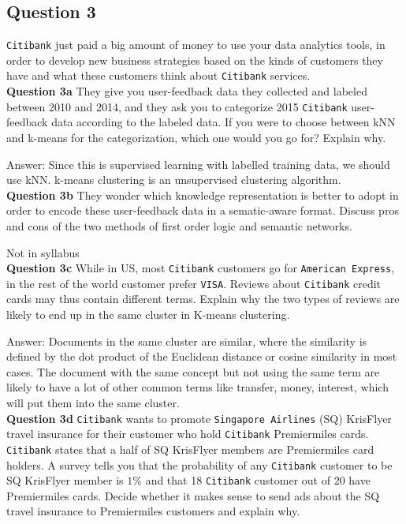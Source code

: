 \documentclass[11pt,a4paper]{report}
\begin{document}
\begin{multicols*}{2}
\section{Question 3}

\verb|Citibank| just paid a big amount of money to use your data analytics tools, in order to develop new business strategies based on the kinds of customers they have and what these customers think about \verb|Citibank| services.\\

\noindent \textbf{Question 3a} They give you user-feedback data they collected and labeled between 2010 and 2014, and they ask you to categorize 2015 \verb|Citibank| user-feedback data according to the labeled data. If you were to choose between kNN and k-means for the categorization, which one would you go for? Explain why.

\noindent Answer: Since this is supervised learning with labelled training data, we should use kNN. k-means clustering is an unsupervised clustering algorithm. \\

\noindent \textbf{Question 3b} They wonder which knowledge representation is better to adopt in order to encode these user-feedback data in a sematic-aware format. Discuss pros and cons of the two methods of first order logic and semantic networks. 

\noindent Not in syllabus \\

\noindent \textbf{Question 3c} While in US, most \verb|Citibank| customers go for \verb|American Express|, in the rest of the world customer prefer \verb|VISA|. Reviews about \verb|Citibank| credit cards may thus contain different terms. Explain why the two types of reviews are likely to end up in the same cluster in K-means clustering.

\noindent Answer: Documents in the same cluster are similar, where the similarity is defined by the dot product of the Euclidean distance or cosine similarity in most cases. The document with the same concept but not using the same term are likely to have a lot of other common terms like transfer, money, interest, which will put them into the same cluster. \\

\noindent \textbf{Question 3d} \verb|Citibank|  wants to promote \verb|Singapore Airlines| (SQ) KrisFlyer travel insurance for their customer who hold \verb|Citibank| Premiermiles cards. \verb|Citibank| states that a half of SQ KrisFlyer members are Premiermiles card holders. A survey tells you that the probability of any \verb|Citibank| customer to be SQ KrisFlyer member is $1\%$ and that 18 \verb|Citibank| customer out of 20 have Premiermiles cards. Decide whether it makes sense to send ads about the SQ travel insurance to Premiermiles customers and explain why. 


\end{multicols*}
\end{document}
